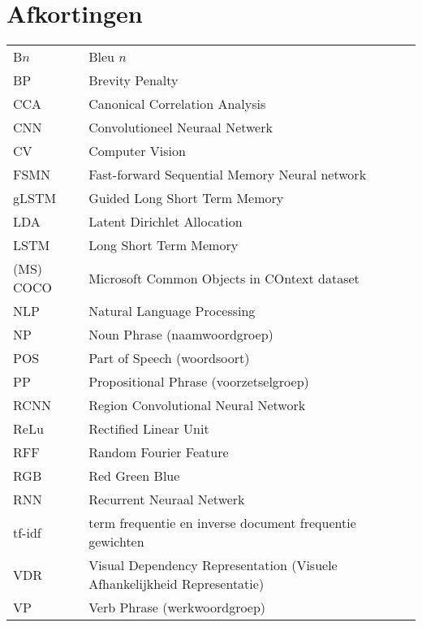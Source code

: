 \documentclass[master=cws,masteroption=ai]{kulemt}
\begin{document}
\section*{Afkortingen}
\begin{flushleft}
  \renewcommand{\arraystretch}{1.1}
  \begin{tabularx}{\textwidth}{@{}p{25mm}X@{}}
  	B$n$ & Bleu $n$\\
  	BP & Brevity Penalty\\
  	CCA & Canonical Correlation Analysis \\
  	CNN & Convolutioneel Neuraal Netwerk \\
  	CV & Computer Vision \\
  	FSMN & Fast-forward Sequential Memory Neural network\\
  	gLSTM & Guided Long Short Term Memory \\
    LDA  & Latent Dirichlet Allocation \\
    LSTM & Long Short Term Memory \\
    (MS) COCO & Microsoft Common Objects in COntext dataset\\
    NLP & Natural Language Processing\\
    NP & Noun Phrase (naamwoordgroep)\\
    POS & Part of Speech (woordsoort)\\
    PP & Propositional Phrase (voorzetselgroep)\\
    RCNN & Region Convolutional Neural Network \\
    ReLu & Rectified Linear Unit\\
    RFF & Random Fourier Feature \\
    RGB & Red Green Blue\\
    RNN & Recurrent Neuraal Netwerk \\
    tf-idf & term frequentie en inverse document frequentie gewichten \\
	VDR & Visual Dependency Representation (Visuele Afhankelijkheid Representatie)\\
	VP & Verb Phrase (werkwoordgroep)\\

  \end{tabularx}
\end{flushleft}
\end{document}
